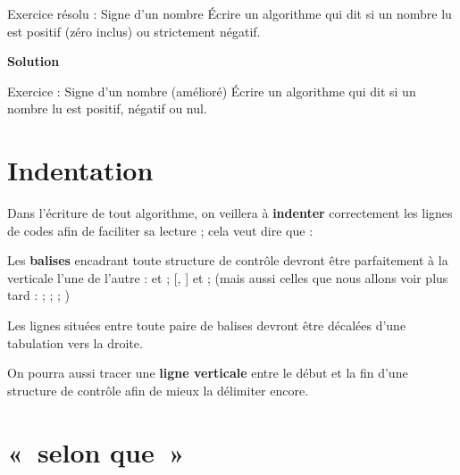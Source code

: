 \begin{Emphase}[exercice]{Exercice résolu : Signe d'un nombre}
Écrire un algorithme qui dit si un nombre lu est positif (zéro inclus)
ou strictement négatif.

{\bfseries Solution}

\end{Emphase}


\begin{Emphase}[exercice]{Exercice : Signe d'un nombre (amélioré)}
Écrire un algorithme qui dit si un nombre lu est positif, négatif ou
nul.
\end{Emphase}

\section{Indentation}

Dans l’écriture de tout algorithme, on veillera à \textbf{indenter}
correctement les lignes de codes afin de faciliter sa lecture ; cela
veut dire que :

\begin{liste}
\item {
Les \textbf{balises} encadrant toute structure de contrôle devront être
parfaitement à la verticale l’une de l’autre : 
et  ; 
[, ] et 
; (mais aussi celles que nous allons voir plus tard
:  ; 
; 
 
; )}
\item {
Les lignes situées entre toute paire de balises devront être décalées
d'une tabulation vers la droite.}
\item {
On pourra aussi tracer une \textbf{ligne verticale} entre le début et la
fin d'une structure de contrôle afin de mieux la
délimiter encore. }
\end{liste}

\section{«~selon que~»}

